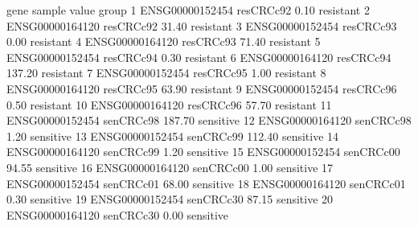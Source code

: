 \documentclass[
]{article}
\newenvironment{Shaded}{\begin{snugshade}}{\end{snugshade}}
\newcommand{\DecValTok}[1]{\textcolor[rgb]{0.00,0.00,0.81}{#1}}
\newcommand{\FunctionTok}[1]{\textcolor[rgb]{0.13,0.29,0.53}{\textbf{#1}}}
\newcommand{\NormalTok}[1]{#1}
\newcommand{\OtherTok}[1]{\textcolor[rgb]{0.56,0.35,0.01}{#1}}
\newcommand{\SpecialCharTok}[1]{\textcolor[rgb]{0.81,0.36,0.00}{\textbf{#1}}}
\newcommand{\StringTok}[1]{\textcolor[rgb]{0.31,0.60,0.02}{#1}}
\begin{document}
\begin{Shaded}
\end{Shaded}

\begin{Shaded}
\begin{Highlighting}[]
\NormalTok{              gene    sample  value     group}
\NormalTok{1  ENSG00000152454 resCRCc92   0.10 resistant}
\NormalTok{2  ENSG00000164120 resCRCc92  31.40 resistant}
\NormalTok{3  ENSG00000152454 resCRCc93   0.00 resistant}
\NormalTok{4  ENSG00000164120 resCRCc93  71.40 resistant}
\NormalTok{5  ENSG00000152454 resCRCc94   0.30 resistant}
\NormalTok{6  ENSG00000164120 resCRCc94 137.20 resistant}
\NormalTok{7  ENSG00000152454 resCRCc95   1.00 resistant}
\NormalTok{8  ENSG00000164120 resCRCc95  63.90 resistant}
\NormalTok{9  ENSG00000152454 resCRCc96   0.50 resistant}
\NormalTok{10 ENSG00000164120 resCRCc96  57.70 resistant}
\NormalTok{11 ENSG00000152454 senCRCc98 187.70 sensitive}
\NormalTok{12 ENSG00000164120 senCRCc98   1.20 sensitive}
\NormalTok{13 ENSG00000152454 senCRCc99 112.40 sensitive}
\NormalTok{14 ENSG00000164120 senCRCc99   1.20 sensitive}
\NormalTok{15 ENSG00000152454 senCRCc00  94.55 sensitive}
\NormalTok{16 ENSG00000164120 senCRCc00   1.00 sensitive}
\NormalTok{17 ENSG00000152454 senCRCc01  68.00 sensitive}
\NormalTok{18 ENSG00000164120 senCRCc01   0.30 sensitive}
\NormalTok{19 ENSG00000152454 senCRCc30  87.15 sensitive}
\NormalTok{20 ENSG00000164120 senCRCc30   0.00 sensitive}
\end{Highlighting}
\end{Shaded}
\end{document}

